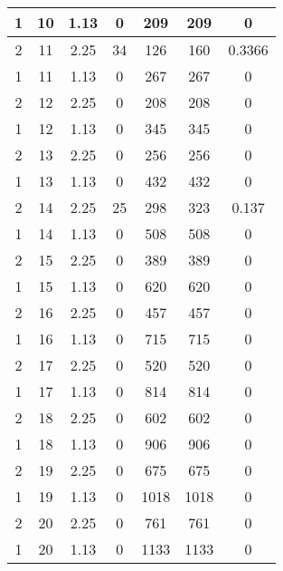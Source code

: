\documentclass[letterpaper, 12pt]{article}
\begin{document}
\begin{longtable}{|c|c|c|c|c|c|c|}
\hline
1 & 10 & 1.13 & 0 & 209 & 209 & 0 \\
\hline
2 & 11 & 2.25 & 34 & 126 & 160 & 0.3366 \\
\hline
1 & 11 & 1.13 & 0 & 267 & 267 & 0 \\
\hline
2 & 12 & 2.25 & 0 & 208 & 208 & 0 \\
\hline
1 & 12 & 1.13 & 0 & 345 & 345 & 0 \\
\hline
2 & 13 & 2.25 & 0 & 256 & 256 & 0 \\
\hline
1 & 13 & 1.13 & 0 & 432 & 432 & 0 \\
\hline
2 & 14 & 2.25 & 25 & 298 & 323 & 0.137 \\
\hline
1 & 14 & 1.13 & 0 & 508 & 508 & 0 \\
\hline
2 & 15 & 2.25 & 0 & 389 & 389 & 0 \\
\hline
1 & 15 & 1.13 & 0 & 620 & 620 & 0 \\
\hline
2 & 16 & 2.25 & 0 & 457 & 457 & 0 \\
\hline
1 & 16 & 1.13 & 0 & 715 & 715 & 0 \\
\hline
2 & 17 & 2.25 & 0 & 520 & 520 & 0 \\
\hline
1 & 17 & 1.13 & 0 & 814 & 814 & 0 \\
\hline
2 & 18 & 2.25 & 0 & 602 & 602 & 0 \\
\hline
1 & 18 & 1.13 & 0 & 906 & 906 & 0 \\
\hline
2 & 19 & 2.25 & 0 & 675 & 675 & 0 \\
\hline
1 & 19 & 1.13 & 0 & 1018 & 1018 & 0 \\
\hline
2 & 20 & 2.25 & 0 & 761 & 761 & 0 \\
\hline
1 & 20 & 1.13 & 0 & 1133 & 1133 & 0 \\
\hline
\end{longtable}
\end{document}
